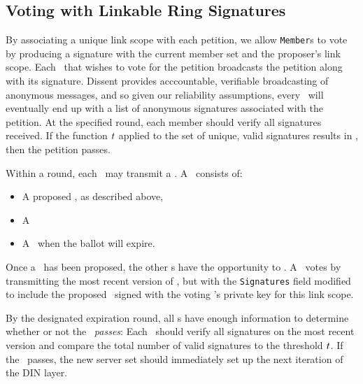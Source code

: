 \subsection{Voting with Linkable Ring Signatures}
By associating a unique link scope with each petition, we allow \texttt{Member}s
to vote by producing a signature with the current member set and the proposer's
link scope. Each \KwMember~that wishes to vote for the petition broadcasts
the petition along with its signature. Dissent provides acccountable, verifiable
broadcasting of anonymous messages, and so given our reliability assumptions,
every \KwMember~will eventually end up with a list of anonymous signatures
associated with the petition. At the specified round, each member should verify
all signatures received. If the function $t$ applied to the set of unique, valid
signatures results in \AtomTrue, then the petition passes.

Within a round, each \KwMember~may  transmit a \KwPetition. A
\KwPetition~consists of:
\begin{itemize}
  \item A proposed \KwManifest, as described above,
  \item A \KwLinkScope{}
  \item A \KwRound~when the ballot will expire.
\end{itemize}

Once a \KwPetition~has been proposed, the other \KwMember s have the
opportunity to \NameVote. A \KwMember~votes by transmitting the most
recent version of \SetVotes, but with the \texttt{Signatures} field
modified to include the proposed \KwManifest~signed with the voting
\KwMember's private key for this link scope.

By the designated expiration round, all \KwMember s have enough
information to determine whether or not the \KwPetition~\emph{passes}:
Each \KwMember~should verify all signatures on the most recent
version
and compare the total number of valid signatures to the threshold $t$. If the
\KwPetition~passes, the new server set should immediately set up the
next iteration of the DIN layer.


